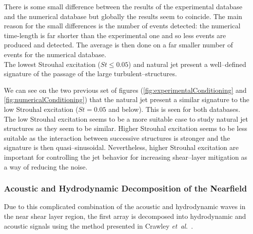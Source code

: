 \documentclass[english]{aiaa-tc}
\newcommand*{\etal}{\textit{et~al}.\ }
\begin{document}
There is some small difference between the results of the experimental database and the numerical database but globally the results seem to coincide.
The main reason for the small differences is the number of events detected: the numerical time-length is far shorter than the experimental one and so
less events are produced and detected. The average is then done on a far smaller number of events for the numerical database. \\
The lowest Strouhal excitation ($St \leq 0.05$) and natural jet present a well--defined signature of the passage of the large turbulent--structures.

We can see on the two previous set of figures (\ref{fig:experimentalConditioning} and \ref{fig:numericalConditioning}) that the natural jet present a similar signature to the low Strouhal excitation ($St = 0.05$ and below). This is seen for both databases. The low Strouhal excitation seems to be a more suitable case to study natural jet structures as they seem to be similar. Higher Strouhal excitation seems to be less suitable as the interaction between successive structures is stronger and the signature is then quasi--sinusoidal. Nevertheless, higher Strouhal excitation are important for controlling the jet behavior for increasing shear--layer mitigation as a way of reducing the noise.

\subsubsection{Acoustic and Hydrodynamic Decomposition of the Nearfield}
Due to this complicated combination of the acoustic and hydrodynamic waves in the near shear layer region, the first array is decomposed into hydrodynamic and acoustic signals using the method presented in Crawley \etal \cite{Crawley2014}.

\end{document}
